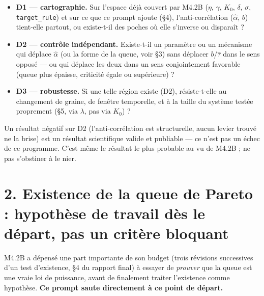 \documentclass[11pt,a4paper]{article}
\newcommand{\code}[1]{\texttt{#1}}
\begin{document}
\begin{itemize}
\item \textbf{D1 --- cartographie.} Sur l'espace déjà couvert par
  M4.2B ($\eta$, $\gamma$, $K_0$, $\delta$, $\sigma$,
  \code{target\_rule}) et sur ce que ce prompt ajoute (\S4),
  l'anti-corrélation ($\hat\alpha$, $b$) tient-elle partout, ou
  existe-t-il des poches où elle s'inverse ou disparaît ?
\item \textbf{D2 --- contrôle indépendant.} Existe-t-il un paramètre
  ou un mécanisme qui déplace $\hat\alpha$ (ou la forme de la queue,
  voir \S3) sans déplacer $b$/$\hat\tau$ dans le sens opposé --- ou
  qui déplace les deux dans un sens conjointement favorable (queue
  plus épaisse, criticité égale ou supérieure) ?
\item \textbf{D3 --- robustesse.} Si une telle région existe (D2),
  résiste-t-elle au changement de graine, de fenêtre temporelle, et à
  la taille du système testée proprement (\S5, via $\lambda$, pas via
  $K_0$) ?
\end{itemize}

Un résultat négatif sur D2 (l'anti-corrélation est structurelle, aucun
levier trouvé ne la brise) est un résultat scientifique valide et
publiable --- ce n'est pas un échec de ce programme. C'est même le
résultat le plus probable au vu de M4.2B ; ne pas s'obstiner à le nier.

\section*{2. Existence de la queue de Pareto : hypothèse de travail dès le départ, pas un critère bloquant}

M4.2B a dépensé une part importante de son budget (trois révisions
successives d'un test d'existence, \S4 du rapport final) à essayer de
\emph{prouver} que la queue est une vraie loi de puissance, avant de
finalement traiter l'existence comme hypothèse. \textbf{Ce prompt
saute directement à ce point de départ.}
\end{document}
